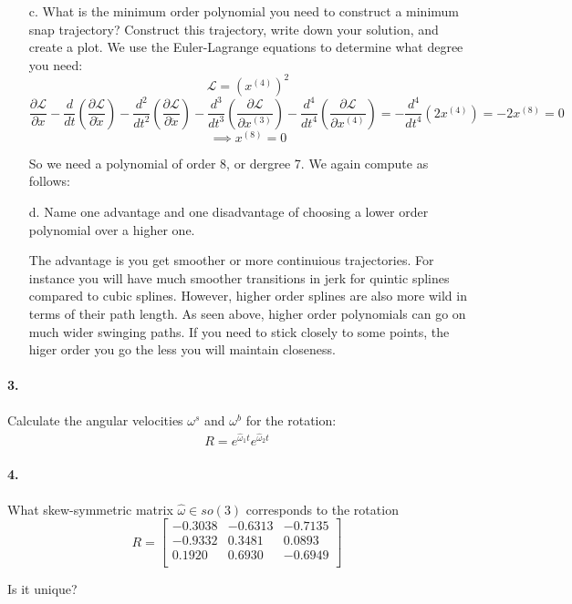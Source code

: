 \documentclass[english]{article}
\begin{document}
\begin{enumerate}
\item[c.] What is the minimum order polynomial you need to construct a minimum snap trajectory? Construct this trajectory, write down your solution, and create a plot. 
We use the Euler-Lagrange equations to determine what degree you need:
\[ \mathcal{L} = (x^{(4)})^2 \]
\[ \frac{\partial \mathcal{L}}{\partial x} - \frac{d}{dt} \left( \frac{\partial \mathcal{L}}{\partial \dot{x}} \right)
  - \frac{d^2}{dt^2} \left( \frac{\partial \mathcal{L}}{\partial \ddot{x}} \right)
  - \frac{d^3}{dt^3} \left( \frac{\partial \mathcal{L}}{\partial x^{(3)}} \right)
  - \frac{d^4}{dt^4} \left( \frac{\partial \mathcal{L}}{\partial x^{(4)}} \right)
  =  - \frac{d^4}{dt^4} \left( 2 x^{(4)} \right) = -2 x^{(8)} = 0\]
  \[ \implies x^{(8)} = 0 \]
  
  So we need a polynomial of order 8, or dergree 7. We again compute as follows:



\item[d.] Name one advantage and one disadvantage of choosing a lower order polynomial over a higher one.  

The advantage is you get smoother or more continuious trajectories. For instance you will have much smoother transitions in jerk for quintic splines compared
 to cubic splines. However, higher order splines are also more wild in terms of their path length. As seen above, higher order polynomials can go on much
 wider swinging paths. If you need to stick closely to some points, the higer order you go the less you will maintain closeness.
 
\end{enumerate}

\paragraph{3.}

Calculate the angular velocities $\omega^s$ and $\omega^b$ for the rotation:
\begin{align}
R = e^{\hat{\omega}_1 t} e^{\hat{\omega}_2 t}
\end{align}



\paragraph{4.} 
What skew-symmetric matrix $\hat{\omega} \in so(3)$ corresponds to the rotation
\begin{equation*}
R= \begin{bmatrix}
   -0.3038 &  -0.6313 & -0.7135\\
   -0.9332  &  0.3481   & 0.0893\\
    0.1920   & 0.6930 &  -0.6949\\
\end{bmatrix}
\end{equation*}


Is it unique?

%
%
\end{document}
